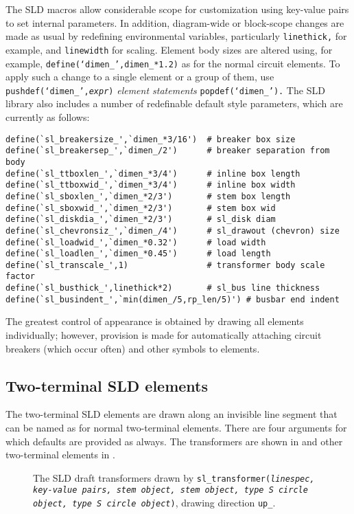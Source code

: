 The SLD macros allow considerable scope for
 customization using key-value pairs to set internal parameters.
 In addition, diagram-wide or block-scope changes are made as usual
 by redefining environmental variables, particularly
 {\tt linethick,} for example, and {\tt linewidth} for scaling.
 Element body sizes are altered using, for example,
 {\tt define(`dimen\_',dimen\_*1.2)} as for the normal circuit elements.
 To apply such a change to a single element or a group of them,
 use {\tt pushdef(`dimen\_',{\sl expr})} {\sl element statements}
 {\tt popdef(`dimen\_').} 
The SLD library also includes a number of redefinable default
style parameters, which are currently as follows:
\begin{verbatim}
define(`sl_breakersize_',`dimen_*3/16')  # breaker box size
define(`sl_breakersep_',`dimen_/2')      # breaker separation from body
define(`sl_ttboxlen_',`dimen_*3/4')      # inline box length
define(`sl_ttboxwid_',`dimen_*3/4')      # inline box width
define(`sl_sboxlen_',`dimen_*2/3')       # stem box length
define(`sl_sboxwid_',`dimen_*2/3')       # stem box wid
define(`sl_diskdia_',`dimen_*2/3')       # sl_disk diam
define(`sl_chevronsiz_',`dimen_/4')      # sl_drawout (chevron) size
define(`sl_loadwid_',`dimen_*0.32')      # load width
define(`sl_loadlen_',`dimen_*0.45')      # load length
define(`sl_transcale_',1)                # transformer body scale factor
define(`sl_busthick_',linethick*2)       # sl_bus line thickness
define(`sl_busindent_',`min(dimen_/5,rp_len/5)') # busbar end indent
\end{verbatim}

 The greatest control of appearance is obtained by drawing all
 elements individually; however,
 provision is made for automatically attaching circuit breakers
 (which occur often)
 and other symbols to elements.

\subsection{Two-terminal SLD elements\label{TwoTermSLD:}}
The two-terminal SLD elements are drawn along an invisible line segment
that can be named as for normal two-terminal elements.
There are four arguments for which defaults are provided as always.
The transformers are shown in  and other two-terminal
elements in .
\begin{figure}[H]
   \vspace*{-\baselineskip}
   \SLDTransformers
   \caption{The SLD draft transformers
     drawn by {\tt sl\_transformer({\sl linespec, key-value pairs,
     stem object, stem object, type {\tt S} circle object,
     type {\tt S} circle object})},
     drawing direction {\tt up\_}.}
   \label{SLDTransformers}
   \end{figure}

